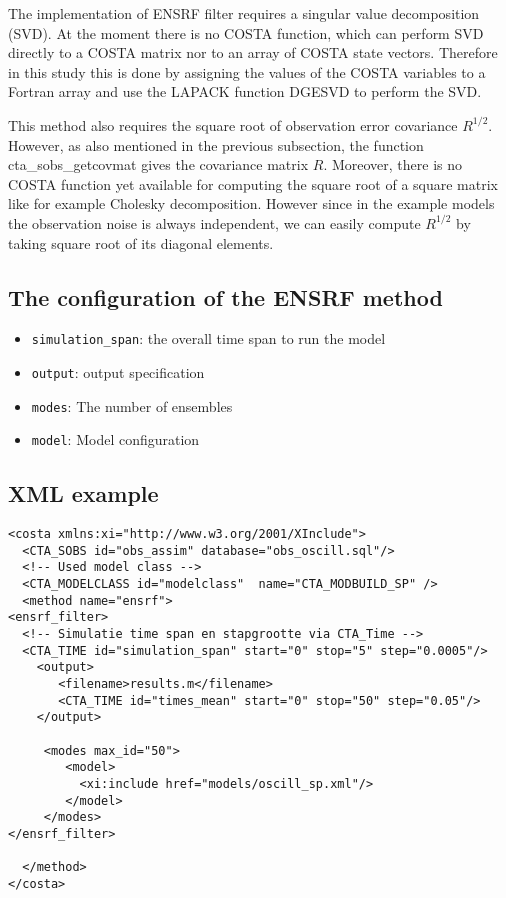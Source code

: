 The implementation of ENSRF filter requires a singular value decomposition
(SVD). At the moment there is no COSTA function, which can perform SVD directly
to a COSTA matrix nor to an array of COSTA state vectors. Therefore in this
study this is done by assigning the values of the COSTA variables to a Fortran
array and use the LAPACK function DGESVD to perform the SVD.

This method also requires the square root of observation error covariance
$R^{1/2}$. However, as also mentioned in the previous subsection, the function
cta\_sobs\_getcovmat gives the covariance matrix $R$. Moreover, there is no
COSTA function yet available for computing the square root of a square matrix
like for example Cholesky decomposition. However since in the example models
the observation noise is always independent, we can easily compute $R^{1/2}$ by
taking square root of its diagonal elements.

\subsection{The configuration of the ENSRF method}
\begin{itemize}
\item {\tt simulation\_span}: the overall time span to run the model
\item {\tt output}: output specification
\item {\tt modes}: The number of ensembles
\item {\tt model}: Model configuration
\end{itemize}

\subsection{XML example}
 \begin{verbatim}
<costa xmlns:xi="http://www.w3.org/2001/XInclude">
  <CTA_SOBS id="obs_assim" database="obs_oscill.sql"/>
  <!-- Used model class -->
  <CTA_MODELCLASS id="modelclass"  name="CTA_MODBUILD_SP" />
  <method name="ensrf"> 
<ensrf_filter>
  <!-- Simulatie time span en stapgrootte via CTA_Time -->
  <CTA_TIME id="simulation_span" start="0" stop="5" step="0.0005"/>
    <output>
       <filename>results.m</filename>
       <CTA_TIME id="times_mean" start="0" stop="50" step="0.05"/>
    </output>

     <modes max_id="50">
        <model>
          <xi:include href="models/oscill_sp.xml"/>
        </model>        
     </modes>
</ensrf_filter>
  
  </method> 
</costa>
 \end{verbatim}




